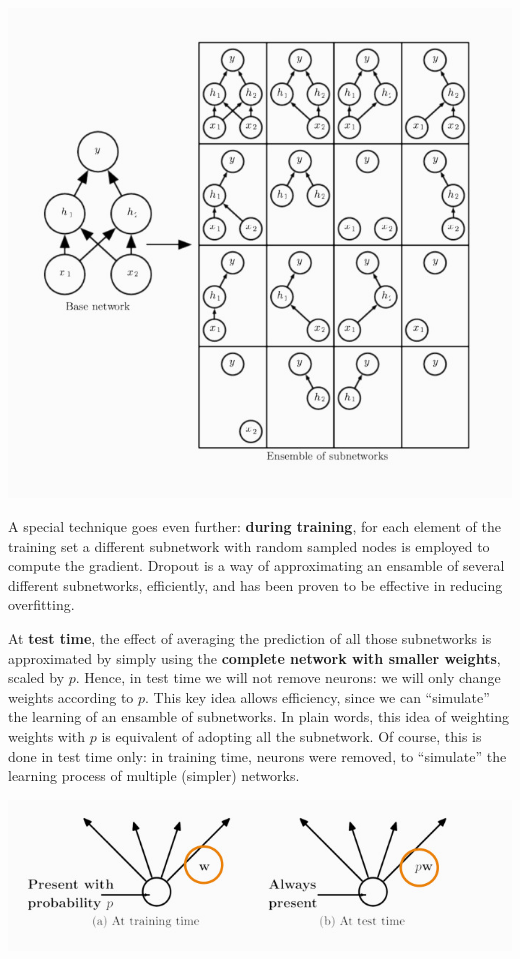 \documentclass[10pt]{report}
\begin{document}
\begin{center}
\includegraphics[width=.9\linewidth]{./pics/cnn/dropout2.jpg}
\end{center}

A special technique goes even further: \textbf{during training}, for each element of the training set a
different subnetwork with random sampled nodes is employed to compute
the gradient. Dropout is a way of approximating an ensamble of several
different subnetworks, efficiently, and has been proven to be effective in
reducing overfitting.

At \textbf{test time}, the effect of averaging the prediction of all those
subnetworks is approximated by simply using the \textbf{complete network with
smaller weights}, scaled by \(p\). Hence, in test time we will not
remove neurons: we will only change weights according to \(p\). This key
idea allows efficiency, since we can ``simulate'' the learning of an
ensamble of subnetworks. In plain words, this idea of weighting weights
with \(p\) is equivalent of adopting all the subnetwork. Of course, this
is done in test time only: in training time, neurons were removed, to ``simulate'' the learning process of multiple (simpler) networks.

\begin{center}
\includegraphics[width=.9\linewidth]{./pics/cnn/dropout3.jpg}
\end{center}
\end{document}
